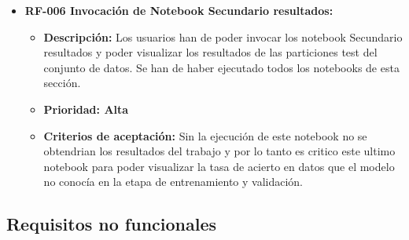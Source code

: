 \begin{itemize}
\item
  \textbf{RF-006 Invocación de Notebook Secundario resultados:}

  \begin{itemize}
  \tightlist
  \item
   \textbf{Descripción:} Los usuarios han de poder invocar los notebook Secundario resultados y poder visualizar los resultados de las particiones test del conjunto de datos. Se han de haber ejecutado todos los notebooks de esta sección.
  \item  
   \textbf{Prioridad: Alta}
  \item  
   \textbf{Criterios de aceptación:} Sin la ejecución de este notebook no se obtendrian los resultados del trabajo y por lo tanto es critico este ultimo notebook para poder visualizar la tasa de acierto en datos que el modelo no conocía en la etapa de entrenamiento y validación.
  \end{itemize}


\end{itemize}


\subsection{Requisitos no funcionales}

